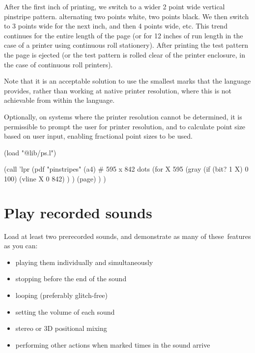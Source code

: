 After the first inch of printing, we switch to a wider 2 point wide
vertical pinstripe pattern. alternating two points white, two points
black. We then switch to 3 points wide for the next inch, and then 4
points wide, etc. This trend continues for the entire length of the page
(or for 12 inches of run length in the case of a printer using
continuous roll stationery). After printing the test pattern the page is
ejected (or the test pattern is rolled clear of the printer enclosure,
in the case of continuous roll printers).

Note that it is an acceptable solution to use the smallest marks that
the language provides, rather than working at native printer resolution,
where this is not achievable from within the language.

Optionally, on systems where the printer resolution cannot be
determined, it is permissible to prompt the user for printer resolution,
and to calculate point size based on user input, enabling fractional
point sizes to be used.


\begin{wideverbatim}

(load "@lib/ps.l")

(call 'lpr
   (pdf "pinstripes"
      (a4)  # 595 x 842 dots
      (for X 595
         (gray (if (bit? 1 X) 0 100)
            (vline X 0 842) ) )
      (page) ) )

\end{wideverbatim}

\pagebreak{}
\section*{Play recorded sounds}

Load at least two prerecorded sounds, and demonstrate as many of
these~features as you can:

\begin{itemize}
\item
  playing them individually and simultaneously
\item
  stopping before the end of the sound
\item
  looping (preferably glitch-free)
\item
  setting the volume of each sound
\item
  stereo or 3D positional mixing
\item
  performing other actions when marked times in the sound arrive
\end{itemize}

